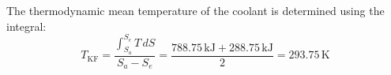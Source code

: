 The thermodynamic mean temperature of the coolant is determined using the integral:  
\[
T_{\text{KF}} = \frac{\int_{S_a}^{S_e} T \, dS}{S_a - S_e} = \frac{788.75 \, \text{kJ} + 288.75 \, \text{kJ}}{2} = 293.75 \, \text{K}
\]